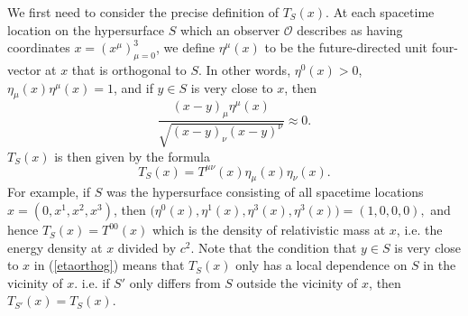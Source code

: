 \documentclass[12pt]{report}
\begin{document}
We first need to consider the precise definition of $T_S(x)$. At each spacetime location on the hypersurface $S$ which an observer $\mathcal{O}$ describes as having coordinates $x=(x^\mu)_{\mu=0}^3$, we define  $\eta^\mu(x)$ %
%
 to be the future-directed  unit four-vector at $x$ that is orthogonal to $S$. In other words, $\eta^0(x)>0$, $\eta_\mu(x)\eta^\mu(x)=1$, and if $y\in S$ is very close to $x$, then 
\begin{equation}\label{etaorthog}
\frac{(x-y)_\mu\eta^\mu(x)}{\sqrt{(x-y)_\nu(x-y)^\nu}}\approx 0.
\end{equation}$T_S(x)$ is then given by the formula 
\begin{equation}\label{TSdef}
T_S(x)=T^{\mu\nu}(x)\eta_{\mu}(x)\eta_{\nu}(x).
\end{equation}%
%
For example, if $S$ was the hypersurface consisting of all spacetime locations $x = (0,x^1,x^2,x^3)$, then $\big(\eta^{0}(x),\eta^{1}(x),\eta^{3}(x),\eta^{3}(x)\big) =(1,0,0,0),$ and hence $T_S(x)=T^{00}(x)$ which is the density of relativistic mass at $x$, i.e. the energy density at $x$ divided by $c^2$. Note that the condition that $y\in S$ is very close to $x$ in (\ref{etaorthog}) means that $T_S(x)$ only has a local dependence \label{localdependenceS} on $S$ in the vicinity of $x$. i.e. if $S'$ only differs from $S$ outside the vicinity of $x$, then  $T_{S'}(x)=T_S(x).$
\end{document}
